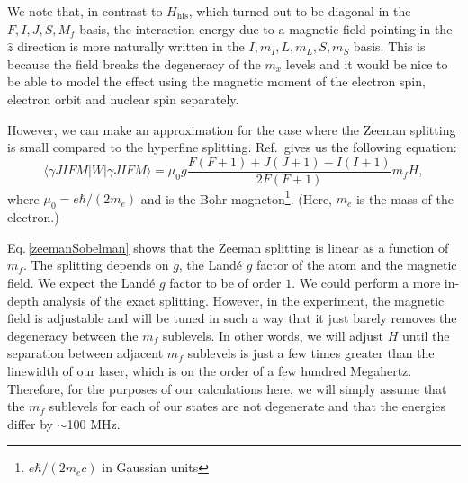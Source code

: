 We note that, in contrast to $H_{\mathrm{hfs}}$, which turned out to be diagonal in the $F,I,J,S,M_f$ basis, the interaction energy due to a magnetic field pointing in the $\hat{z}$ direction is more naturally written in the $I,m_I, L,m_L,S,m_S$ basis. This is because the field breaks the degeneracy of the $m_x$ levels and it would be nice to be able to model the effect using the magnetic moment of the electron spin, electron orbit and nuclear spin separately. 

However, we can make an approximation for the case where the Zeeman splitting is small compared to the hyperfine splitting. 
Ref.\,\cite{sobelman_spectra} gives us the following equation:
\begin{equation} \label{zeemanSobelman}
\langle{\gamma JIFM|W|\gamma JIFM\rangle = \mu_0 g \frac{F(F+1)+J(J+1)-I(I+1)}{2F(F+1)}m_f H},
\end{equation}
where $\mu_0=e\hbar/(2 m_e)$ and is the Bohr magneton\footnote{$e \hbar / (2 m_e c)$ in Gaussian units}. (Here, $m_e$ is the mass of the electron.)

Eq.\,\ref{zeemanSobelman} shows that the Zeeman splitting is linear as a function of $m_f$. The splitting depends on $g$, the Land\'e $g$ factor of the atom and the magnetic field. We expect the Land\'e $g$ factor to be of order $1$. We could perform a more in-depth analysis of the exact splitting. However, in the experiment, the magnetic field is adjustable and will be tuned in such a way that it just barely removes the degeneracy between the $m_f$ sublevels. In other words, we will adjust $H$ until the separation between adjacent $m_f$ sublevels is just a few times greater than the linewidth of our laser, which is on the order of a few hundred Megahertz. Therefore, for the purposes of our calculations here, we will simply assume that the $m_f$ sublevels for each of our states are not degenerate and that the energies differ by $\sim$100 MHz.


